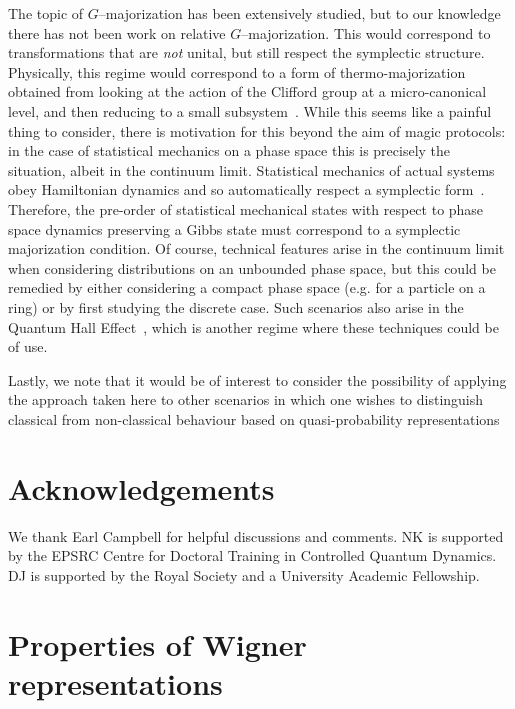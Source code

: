 \documentclass[pra,
aps,
twocolumn,
superscriptaddress,
groupedaddress,
nofootinbib,
reprint
]{revtex4-1}
\begin{document}
The topic of $G$--majorization has been extensively studied, but to our knowledge there has not been work on relative $G$--majorization. This would correspond to transformations that are \emph{not} unital, but still respect the symplectic structure. Physically, this regime would correspond to a form of thermo-majorization obtained from looking at the action of the Clifford group at a micro-canonical level, and then reducing to a small subsystem~\cite{cit:lostaglio, Pathria_1997}. While this seems like a painful thing to consider, there is motivation for this beyond the aim of magic protocols: in the case of statistical mechanics on a phase space this is precisely the situation, albeit in the continuum limit. Statistical mechanics of actual systems obey Hamiltonian dynamics and so automatically respect a symplectic form~\cite{Pathria_1997}. Therefore, the pre-order of statistical mechanical states with respect to phase space dynamics preserving a Gibbs state must correspond to a symplectic majorization condition. Of course, technical features arise in the continuum limit when considering distributions on an unbounded phase space, but this could be remedied by either considering a compact phase space (e.g. for a particle on a ring) or by first studying the discrete case. Such scenarios also arise in the Quantum Hall Effect~\cite{Klitzing_1980}, which is another regime where these techniques could be of use.

Lastly, we note that it would be of interest to consider the possibility of applying the approach taken here to other scenarios in which one wishes to distinguish classical from non-classical behaviour based on quasi-probability representations~\cite{Ferrie_2008, barnett_1997,Allahverdyan_2018, arvidsson_2020, halpern_2018, Lostaglio_2018, Levy_2020}
\section{Acknowledgements}
We thank Earl Campbell for helpful discussions and comments. NK is supported by the EPSRC Centre for Doctoral Training in Controlled Quantum Dynamics. DJ is supported by the Royal Society and a University Academic Fellowship.
	


%


\appendix
\newpage
\section{Properties of Wigner representations}
\label{app:wigner}
\end{document}
